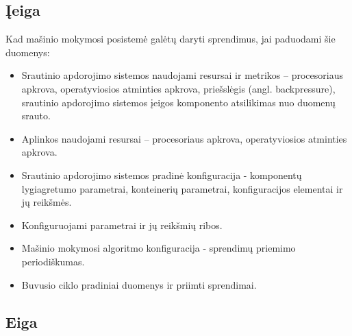 \documentclass{VUMIFPSbakalaurinis}
\begin{document}
\subsection{Įeiga}
Kad mašinio mokymosi posistemė galėtų daryti sprendimus, jai paduodami šie duomenys:
\begin{itemize}
    \item Srautinio apdorojimo sistemos naudojami resursai ir metrikos – procesoriaus apkrova, operatyviosios atminties apkrova, priešslėgis (angl. backpressure), srautinio apdorojimo sistemos įeigos komponento atsilikimas nuo duomenų srauto.
    \item Aplinkos naudojami resursai – procesoriaus apkrova, operatyviosios atminties apkrova.
    \item Srautinio apdorojimo sistemos pradinė konfiguracija - komponentų lygiagretumo parametrai, konteinerių parametrai, konfiguracijos elementai ir jų reikšmės.
    \item Konfiguruojami parametrai ir jų reikšmių ribos.
    \item Mašinio mokymosi algoritmo konfiguracija - sprendimų priemimo periodiškumas.
    \item Buvusio ciklo pradiniai duomenys ir priimti sprendimai.
\end{itemize}

\subsection{Eiga}
\end{document}
